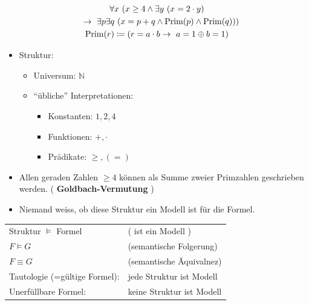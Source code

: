 \begin{bsp*}
	\begin{gather*}
		\forall x~( x \geq 4 \wedge \exists y~( x = 2 \cdot y ) \\
		\quad \rightarrow \exists p \exists q~( x = p + q \wedge \Prim( p ) \wedge \Prim( q ) ) ) \\
		\Prim( r ) \coloneqq ( r = a \cdot b \rightarrow a = 1 \oplus b = 1 )
	\end{gather*}
	\begin{itemize}
		\item Struktur:
		\begin{itemize}
			\item Universum: $\mathbb{N}$
			\item \enquote{übliche} Interpretationen:
			\begin{itemize}
				\item Konstanten: $1 , 2 , 4$
				\item Funktionen: $+ , \cdot$
				\item Prädikate: $\geq , ( = )$
			\end{itemize}
		\end{itemize}
		\item Allen geraden Zahlen $\geq 4$ können als Summe zweier Primzahlen geschrieben werden. ( \textbf{Goldbach-Vermutung} )
		\item Niemand weiss, ob diese Struktur ein Modell ist für die Formel.
	\end{itemize}
\end{bsp*}
\begin{bem}
	\begin{tabular}{ l l }
		Struktur $\models$ Formel		& ( ist ein Modell )		\\
		$F \models G$				& (semantische Folgerung)	\\
		$F \equiv G$				& (semantische Äquivalnez)	\\
		Tautologie (=gültige Formel):	& jede Struktur ist Modell	\\
		Unerfüllbare Formel:			& keine Struktur ist Modell	
	\end{tabular}
\end{bem}
